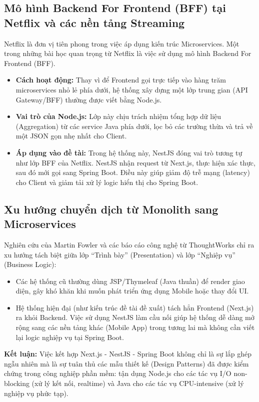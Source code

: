 \documentclass[12pt,a4paper]{report}
\begin{document}
\subsection{Mô hình Backend For Frontend (BFF) tại Netflix và các nền tảng Streaming}
Netflix là đơn vị tiên phong trong việc áp dụng kiến trúc Microservices. Một trong những bài học quan trọng từ Netflix là việc sử dụng mô hình Backend For Frontend (BFF).
\begin{itemize}
    \item \textbf{Cách hoạt động:} Thay vì để Frontend gọi trực tiếp vào hàng trăm microservices nhỏ lẻ phía dưới, hệ thống xây dựng một lớp trung gian (API Gateway/BFF) thường được viết bằng Node.js.
    \item \textbf{Vai trò của Node.js:} Lớp này chịu trách nhiệm tổng hợp dữ liệu (Aggregation) từ các service Java phía dưới, lọc bỏ các trường thừa và trả về một JSON gọn nhẹ nhất cho Client.
    \item \textbf{Áp dụng vào đề tài:} Trong hệ thống này, NestJS đóng vai trò tương tự như lớp BFF của Netflix. NestJS nhận request từ Next.js, thực hiện xác thực, sau đó mới gọi sang Spring Boot. Điều này giúp giảm độ trễ mạng (latency) cho Client và giảm tải xử lý logic hiển thị cho Spring Boot.
\end{itemize}

\subsection{Xu hướng chuyển dịch từ Monolith sang Microservices}
Nghiên cứu của Martin Fowler và các báo cáo công nghệ từ ThoughtWorks chỉ ra xu hướng tách biệt giữa lớp ``Trình bày'' (Presentation) và lớp ``Nghiệp vụ'' (Business Logic):
\begin{itemize}
    \item Các hệ thống cũ thường dùng JSP/Thymeleaf (Java thuần) để render giao diện, gây khó khăn khi muốn phát triển ứng dụng Mobile hoặc thay đổi UI.
    \item Hệ thống hiện đại (như kiến trúc đề tài đề xuất) tách hẳn Frontend (Next.js) ra khỏi Backend. Việc sử dụng NestJS làm cầu nối giúp hệ thống dễ dàng mở rộng sang các nền tảng khác (Mobile App) trong tương lai mà không cần viết lại logic nghiệp vụ tại Spring Boot.
\end{itemize}

\textbf{Kết luận:} Việc kết hợp Next.js - NestJS - Spring Boot không chỉ là sự lắp ghép ngẫu nhiên mà là sự tuân thủ các mẫu thiết kế (Design Patterns) đã được kiểm chứng trong công nghiệp phần mềm: tận dụng Node.js cho các tác vụ I/O non-blocking (xử lý kết nối, realtime) và Java cho các tác vụ CPU-intensive (xử lý nghiệp vụ phức tạp).
\end{document}

